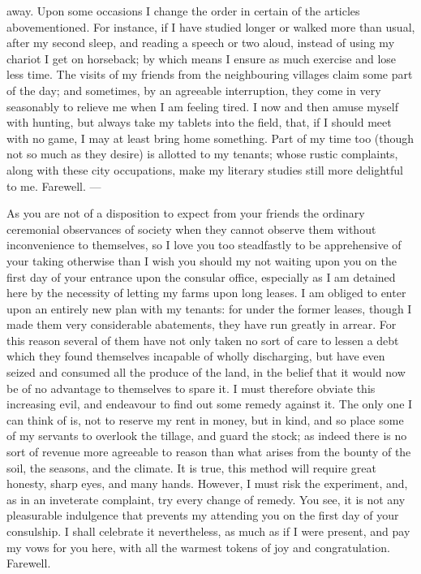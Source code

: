 away. Upon some occasions I change the order in certain of the articles
abovementioned. For instance, if I have studied longer or walked more than
usual, after my second sleep, and reading a speech or two aloud, instead
of using my chariot I get on horseback; by which means I ensure as much
exercise and lose less time. The visits of my friends from the
neighbouring villages claim some part of the day; and sometimes, by an
agreeable interruption, they come in very seasonably to relieve me when I
am feeling tired. I now and then amuse myself with hunting, but always
take my tablets into the field, that, if I should meet with no game, I may
at least bring home something. Part of my time too (though not so much as
they desire) is allotted to my tenants; whose rustic complaints, along
with these city occupations, make my literary studies still more
delightful to me. Farewell. —


As you are not of a disposition to expect from your friends the ordinary
ceremonial observances of society when they cannot observe them without
inconvenience to themselves, so I love you too steadfastly to be
apprehensive of your taking otherwise than I wish you should my not
waiting upon you on the first day of your entrance upon the consular
office, especially as I am detained here by the necessity of letting my
farms upon long leases. I am obliged to enter upon an entirely new plan
with my tenants: for under the former leases, though I made them very
considerable abatements, they have run greatly in arrear. For this reason
several of them have not only taken no sort of care to lessen a debt which
they found themselves incapable of wholly discharging, but have even
seized and consumed all the produce of the land, in the belief that it
would now be of no advantage to themselves to spare it. I must therefore
obviate this increasing evil, and endeavour to find out some remedy
against it. The only one I can think of is, not to reserve my rent in
money, but in kind, and so place some of my servants to overlook the
tillage, and guard the stock; as indeed there is no sort of revenue more
agreeable to reason than what arises from the bounty of the soil, the
seasons, and the climate. It is true, this method will require great
honesty, sharp eyes, and many hands. However, I must risk the experiment,
and, as in an inveterate complaint, try every change of remedy. You see,
it is not any pleasurable indulgence that prevents my attending you on the
first day of your consulship. I shall celebrate it nevertheless, as much
as if I were present, and pay my vows for you here, with all the warmest
tokens of joy and congratulation. Farewell.

